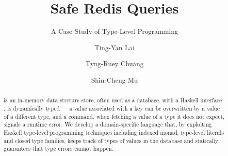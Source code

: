 \documentclass{llncs}
\begin{document}
\title{Safe Redis Queries}
\subtitle{A Case Study of Type-Level Programming}
\author{Ting-Yan Lai \and Tyng-Ruey Chuang 
  \and Shin-Cheng Mu }

\maketitle

\begin{abstract}
\Redis{} is an in-memory data strcture store, often used as a database, with a
Haskell interface \Hedis{}. \Redis{} is dynamically typed --- a value associated
with a key can be overwritten by a value of a different type, and a command,
when fetching a value of a type it does not expect, signals a runtime error. We
develop a domain-specific language that, by exploiting Haskell type-level
programming techniques including indexed monad, type-level literals and closed
type families, keeps track of types of values in the database and statically
guarantees that type errors cannot happen.
\end{abstract}


%












\end{document}
